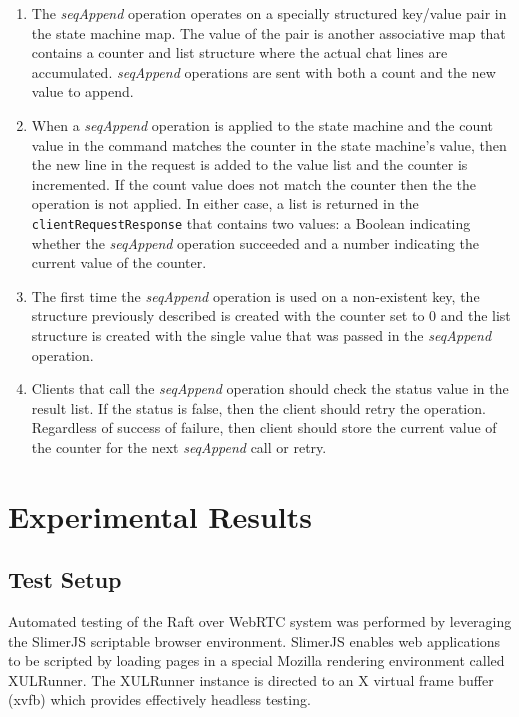 \documentclass[conference,compsoc]{./IEEEtran/IEEEtran}
\begin{document}
\begin{enumerate}
\item The \emph{seqAppend} operation operates on a specially structured key/value pair in the state machine map. The value of the pair is another associative map that contains a counter and list structure where the actual chat lines are accumulated. \emph{seqAppend} operations are sent with both a count and the new value to append.
\item When a \emph{seqAppend} operation is applied to the state machine and the count value in the command matches the counter in the state machine's value, then the new line in the request is added to the value list and the counter is incremented. If the count value does not match the counter then the the operation is not applied. In either case, a list is returned in the \texttt{clientRequestResponse} that contains two values: a Boolean indicating whether the \emph{seqAppend} operation succeeded and a number indicating the current value of the counter.
\item The first time the \emph{seqAppend} operation is used on a non-existent key, the structure previously described is created with the counter set to 0 and the list structure is created with the single value that was passed in the \emph{seqAppend} operation.\
\item Clients that call the \emph{seqAppend} operation should check the status value in the result list. If the status is false, then the client should retry the operation. Regardless of success of failure, then client should store the current value of the counter for the next \emph{seqAppend} call or retry.
\end{enumerate}

\section{Experimental Results}

\subsection{Test Setup}

Automated testing of the Raft over WebRTC system was performed by leveraging the SlimerJS scriptable browser environment. SlimerJS enables web applications to be scripted by loading pages in a special Mozilla rendering environment called XULRunner. The XULRunner instance is directed to an X virtual frame buffer (xvfb) which provides effectively headless testing.
\end{document}
